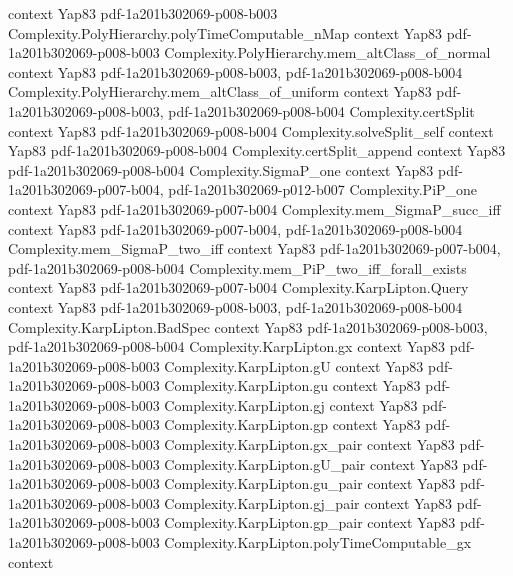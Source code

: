 \begin{theorem}
  {context}
  {Yap83}
  {pdf-1a201b302069-p008-b003}
\proofstep
  {Complexity.PolyHierarchy.polyTimeComputable_nMap}
  {context}
  {Yap83}
  {pdf-1a201b302069-p008-b003}
\proofstep
  {Complexity.PolyHierarchy.mem_altClass_of_normal}
  {context}
  {Yap83}
  {pdf-1a201b302069-p008-b003,
    pdf-1a201b302069-p008-b004}
\proofstep
  {Complexity.PolyHierarchy.mem_altClass_of_uniform}
  {context}
  {Yap83}
  {pdf-1a201b302069-p008-b003,
    pdf-1a201b302069-p008-b004}
\proofstep
  {Complexity.certSplit}
  {context}
  {Yap83}
  {pdf-1a201b302069-p008-b004}
\proofstep
  {Complexity.solveSplit_self}
  {context}
  {Yap83}
  {pdf-1a201b302069-p008-b004}
\proofstep
  {Complexity.certSplit_append}
  {context}
  {Yap83}
  {pdf-1a201b302069-p008-b004}
\proofstep
  {Complexity.SigmaP_one}
  {context}
  {Yap83}
  {pdf-1a201b302069-p007-b004,
    pdf-1a201b302069-p012-b007}
\proofstep
  {Complexity.PiP_one}
  {context}
  {Yap83}
  {pdf-1a201b302069-p007-b004}
\proofstep
  {Complexity.mem_SigmaP_succ_iff}
  {context}
  {Yap83}
  {pdf-1a201b302069-p007-b004,
    pdf-1a201b302069-p008-b004}
\proofstep
  {Complexity.mem_SigmaP_two_iff}
  {context}
  {Yap83}
  {pdf-1a201b302069-p007-b004,
    pdf-1a201b302069-p008-b004}
\proofstep
  {Complexity.mem_PiP_two_iff_forall_exists}
  {context}
  {Yap83}
  {pdf-1a201b302069-p007-b004}
\proofstep
  {Complexity.KarpLipton.Query}
  {context}
  {Yap83}
  {pdf-1a201b302069-p008-b003,
    pdf-1a201b302069-p008-b004}
\proofstep
  {Complexity.KarpLipton.BadSpec}
  {context}
  {Yap83}
  {pdf-1a201b302069-p008-b003,
    pdf-1a201b302069-p008-b004}
\proofstep
  {Complexity.KarpLipton.gx}
  {context}
  {Yap83}
  {pdf-1a201b302069-p008-b003}
\proofstep
  {Complexity.KarpLipton.gU}
  {context}
  {Yap83}
  {pdf-1a201b302069-p008-b003}
\proofstep
  {Complexity.KarpLipton.gu}
  {context}
  {Yap83}
  {pdf-1a201b302069-p008-b003}
\proofstep
  {Complexity.KarpLipton.gj}
  {context}
  {Yap83}
  {pdf-1a201b302069-p008-b003}
\proofstep
  {Complexity.KarpLipton.gp}
  {context}
  {Yap83}
  {pdf-1a201b302069-p008-b003}
\proofstep
  {Complexity.KarpLipton.gx_pair}
  {context}
  {Yap83}
  {pdf-1a201b302069-p008-b003}
\proofstep
  {Complexity.KarpLipton.gU_pair}
  {context}
  {Yap83}
  {pdf-1a201b302069-p008-b003}
\proofstep
  {Complexity.KarpLipton.gu_pair}
  {context}
  {Yap83}
  {pdf-1a201b302069-p008-b003}
\proofstep
  {Complexity.KarpLipton.gj_pair}
  {context}
  {Yap83}
  {pdf-1a201b302069-p008-b003}
\proofstep
  {Complexity.KarpLipton.gp_pair}
  {context}
  {Yap83}
  {pdf-1a201b302069-p008-b003}
\proofstep
  {Complexity.KarpLipton.polyTimeComputable_gx}
  {context}

\end{theorem}

